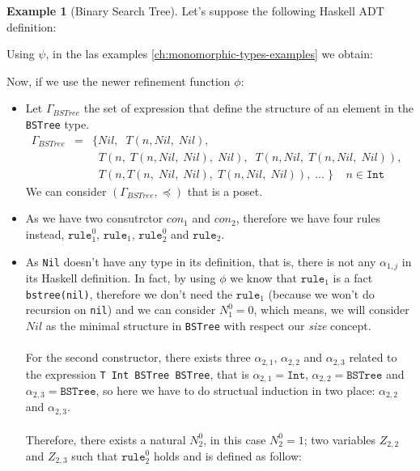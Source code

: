 \documentclass{report}
\theoremstyle{definition}
\newtheorem{example}{Example}[section]
\theoremstyle{definition}
\newcommand{\ttt}[1]{\texttt{#1}}
\newcommand{\tav}{\;\;}
\begin{document}
\begin{example}[Binary Search Tree]
	Let's suppose the following Haskell ADT definition:
	
	Using $\psi$, in the las examples \ref{ch:monomorphic-types-examples} we obtain:

Now, if we use the newer refinement function $\phi$:
\begin{itemize}
	\item Let $\Gamma_{BSTree}$ the set of expression that define the structure of an element in the \ttt{BSTree} type.
	\begin{eqnarray*}
		\Gamma_{BSTree} & = & \{ Nil, \tav T(n, Nil, \; Nil), \\
						&& \tav T(n, \; T(n, Nil, \; Nil), \; Nil), \tav T(n, Nil, \; T(n, Nil, \; Nil)), \tav  \\
						&& \tav T(n, T(n, \; Nil, \; Nil), \; T(n, Nil, \; Nil)), \; \ldots \; \} \tav \tav n \in \ttt{Int}
	\end{eqnarray*}
	We can consider $(\Gamma_{BSTree}, \preceq)$ that is a poset.
	\item As we have two consutrctor $con_1$ and $con_2$, therefore we have four rules instead, $\ttt{rule}_{1}^{0}$, $\ttt{rule}_1$, $\ttt{rule}_{2}^{0}$ and $\ttt{rule}_2$.
	\item As \ttt{Nil} doesn't have any type in its definition, that is, there is not any $\alpha_{1,j}$ in its Haskell definition. In fact, by using $\phi$ we know that $\ttt{rule}_1$ is a fact \ttt{bstree(nil)}, therefore we don't need the $\ttt{rule}_1$ (because we won't do recursion on \ttt{nil}) and we can consider $N_{1}^{0} = 0$, which means, we will consider $Nil$ as the minimal structure in \ttt{BSTree} with respect our \textit{size} concept.\\\\
	For the second constructor, there exists three $\alpha_{2,1}$, $\alpha_{2,2}$ and $\alpha_{2,3}$ related to the expression \ttt{T Int BSTree BSTree}, that is $\alpha_{2,1} = \ttt{Int}$, $\alpha_{2,2} = \ttt{BSTree}$ and $\alpha_{2,3} = \ttt{BSTree}$, so here we have to do structual induction in two place: $\alpha_{2,2}$ and $\alpha_{2,3}$.\\\\
	Therefore, there exists a natural $N_{2}^{0}$, in this case $N_{2}^{0} = 1$; two variables $Z_{2,2}$ and $Z_{2,3}$ such that $\ttt{rule}_{2}^{0}$ holds and is defined as follow:

\end{itemize}
\end{example}
\end{document}
